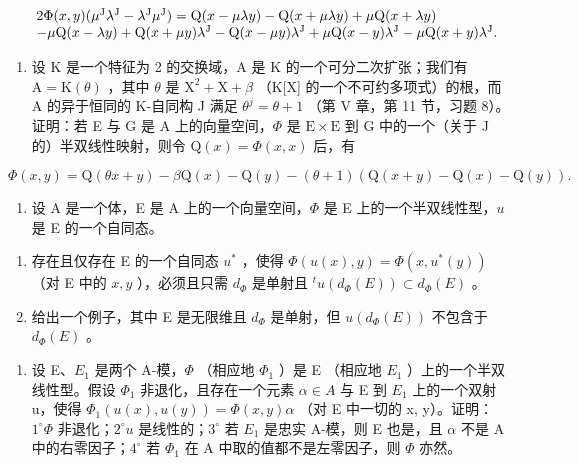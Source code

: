 \[
\begin{array}{r l} & {2 \Phi (x, y) (\mu^ {\mathrm{J}} \lambda^ {\mathrm{J}} - \lambda^ {\mathrm{J}} \mu^ {\mathrm{J}}) = \mathrm{Q} (x - \mu \lambda y) - \mathrm{Q} (x + \mu \lambda y) + \mu \mathrm{Q} (x + \lambda y)} \\ & {- \mu \mathrm{Q} (x - \lambda y) + \mathrm{Q} (x + \mu y) \lambda^ {\mathrm{J}} - \mathrm{Q} (x - \mu y) \lambda^ {\mathrm{J}} + \mu \mathrm{Q} (x - y) \lambda^ {\mathrm{J}} - \mu \mathrm{Q} (x + y) \lambda^ {\mathrm{J}}.} \end{array}
\]

\begin{enumerate}
\def\labelenumi{\arabic{enumi})}
\setcounter{enumi}{4}
\tightlist
\item
  设 K 是一个特征为 2 的交换域，A 是 K 的一个可分二次扩张；我们有 \(\mathrm{A} = \mathrm{K}(\theta)\) ，其中 \(\theta\) 是 \(\mathrm{X}^2 +\mathrm{X} + \beta\) （K{[}X{]} 的一个不可约多项式）的根，而 A 的异于恒同的 K-自同构 J 满足 \(\theta^{j} = \theta +1\) （第 V 章，第 11 节，习题 8）。证明：若 E 与 G 是 A 上的向量空间，\(\Phi\) 是 \(\mathrm{E}\times \mathrm{E}\) 到 G 中的一个（关于 J 的）半双线性映射，则令 \(\mathrm{Q}(x) = \Phi (x,x)\) 后，有
\end{enumerate}

\[
\Phi (x, y) = \mathrm{Q} (\theta x + y) - \beta \mathrm{Q} (x) - \mathrm{Q} (y) - (\theta + 1) (\mathrm{Q} (x + y) - \mathrm{Q} (x) - \mathrm{Q} (y)).
\]

\begin{enumerate}
\def\labelenumi{\arabic{enumi})}
\setcounter{enumi}{5}
\tightlist
\item
  设 A 是一个体，E 是 A 上的一个向量空间，\(\Phi\) 是 E 上的一个半双线性型，\(u\) 是 E 的一个自同态。
\end{enumerate}

\begin{enumerate}
\def\labelenumi{\alph{enumi})}
\item
  存在且仅存在 E 的一个自同态 \(u^*\) ，使得 \(\Phi(u(x), y) = \Phi(x, u^*(y))\) （对 E 中的 \(x, y\) ），必须且只需 \(d_\Phi\) 是单射且 \(^t u(d_\Phi(E)) \subset d_\Phi(E)\) 。
\item
  给出一个例子，其中 E 是无限维且 \(d_{\Phi}\) 是单射，但 \(u(d_{\Phi}(E))\) 不包含于 \(d_{\Phi}(E)\) 。
\end{enumerate}

\begin{enumerate}
\def\labelenumi{\arabic{enumi})}
\setcounter{enumi}{6}
\tightlist
\item
  设 E、\(E_{1}\) 是两个 A-模，\(\Phi\) （相应地 \(\Phi_{1}\) ）是 E （相应地 \(E_{1}\) ）上的一个半双线性型。假设 \(\Phi_{1}\) 非退化，且存在一个元素 \(\alpha\in A\) 与 E 到 \(E_{1}\) 上的一个双射 u，使得 \(\Phi_{1}(u(x), u(y))=\Phi(x,y)\alpha\) （对 E 中一切的 x, y）。证明：\(1^{\circ}\Phi\) 非退化；\(2^{\circ}u\) 是线性的；\(3^{\circ}\) 若 \(E_{1}\) 是忠实 A-模，则 E 也是，且 \(\alpha\) 不是 A 中的右零因子；\(4^{\circ}\) 若 \(\Phi_{1}\) 在 A 中取的值都不是左零因子，则 \(\Phi\) 亦然。
\end{enumerate}

